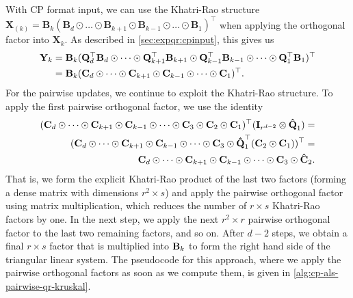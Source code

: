 \documentclass{article}
\newcommand{\mat}[1]{\mathbf{#1}}
\newcommand{\M}[2][]{\bm{#1{\mathbf{\MakeUppercase{#2}}}}} 		%
\begin{document}
With CP format input, we can use the Khatri-Rao structure $\mat{X}_{(k)} = \mat{B}_{k}(\mat{B}_{d} \odot \dots \odot \mat{B}_{k+1} \odot \mat{B}_{k-1}  \odot \dots \odot \mat{B}_{1})^\top$ when applying the orthogonal factor into $\mat{X}_k$. 
As described in \cref{sec:expqr:cpinput}, this gives us
\begin{align*}
  \mat{Y}_k &= \mat{B}_k(\mat{Q}_d^\top\mat{B}_d \odot \cdots \odot \mat{Q}_{k+1}^\top\mat{B}_{k+1} \odot \mat{Q}_{k-1}^\top\mat{B}_{k-1} \odot \cdots \odot \mat{Q}_1^\top\mat{B}_1)^\top \\
  &= \mat{B}_k(\mat{C}_d \odot \cdots \odot \mat{C}_{k+1} \odot \M{C}_{k-1} \odot \cdots \odot \M{C}_1)^\top.
\end{align*}
For the pairwise updates, we continue to exploit the Khatri-Rao structure.
To apply the first pairwise orthogonal factor, we use the identity
\begin{align*}
(\M{C}_d \odot \cdots \odot \M{C}_{k+1} \odot \M{C}_{k-1} \odot \cdots \odot \M{C}_3 \odot \M{C}_2 \odot \M{C}_1)^\top(\M{I}_{r^{d-2}} \otimes \M[\hat]{Q}_1) = \\
(\M{C}_d \odot \cdots \odot \M{C}_{k+1} \odot \M{C}_{k-1} \odot \cdots \odot \M{C}_3 \odot \M[\hat]{Q}_1^\top(\M{C}_2 \odot \M{C}_1))^\top = \\
\M{C}_d \odot \cdots \odot \M{C}_{k+1} \odot \M{C}_{k-1} \odot \cdots \odot \M{C}_3 \odot \M[\hat]{C}_2.
\end{align*}
That is, we form the explicit Khatri-Rao product of the last two factors (forming a dense matrix with dimensions $r^2 \times s$) and apply the pairwise orthogonal factor using matrix multiplication, which reduces the number of $r \times s$ Khatri-Rao factors by one.
In the next step, we apply the next $r^2 \times r$ pairwise orthogonal factor to the last two remaining factors, and so on.
After $d-2$ steps, we obtain a final $r\times s$ factor that is multiplied into $\M{B}_k$ to form the right hand side of the triangular linear system.
The pseudocode for this approach, where we apply the pairwise orthogonal factors as soon as we compute them, is given in \cref{alg:cp-als-pairwise-qr-kruskal}.


\begin{algorithm}
  \caption{CP-Round-ALS-QR-Imp}
  \label{alg:cp-als-pairwise-qr-kruskal}
  
\end{algorithm}
\end{document}
